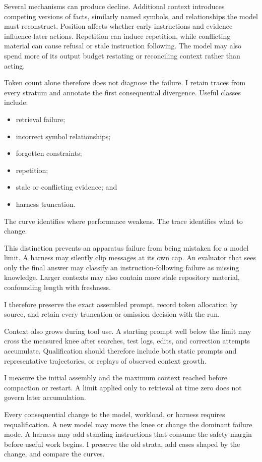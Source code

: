Several mechanisms can produce decline. Additional context introduces competing versions of facts, similarly named symbols, and relationships the model must reconstruct. Position affects whether early instructions and evidence influence later actions. Repetition can induce repetition, while conflicting material can cause refusal or stale instruction following. The model may also spend more of its output budget restating or reconciling context rather than acting.

Token count alone therefore does not diagnose the failure. I retain traces from every stratum and annotate the first consequential divergence. Useful classes include:

\begin{itemize}
\tightlist
\item
  retrieval failure;
\item
  incorrect symbol relationships;
\item
  forgotten constraints;
\item
  repetition;
\item
  stale or conflicting evidence; and
\item
  harness truncation.
\end{itemize}

The curve identifies where performance weakens. The trace identifies what to change.

This distinction prevents an apparatus failure from being mistaken for a model limit. A harness may silently clip messages at its own cap. An evaluator that sees only the final answer may classify an instruction-following failure as missing knowledge. Larger contexts may also contain more stale repository material, confounding length with freshness.

I therefore preserve the exact assembled prompt, record token allocation by source, and retain every truncation or omission decision with the run.

Context also grows during tool use. A starting prompt well below the limit may cross the measured knee after searches, test logs, edits, and correction attempts accumulate. Qualification should therefore include both static prompts and representative trajectories, or replays of observed context growth.

I measure the initial assembly and the maximum context reached before compaction or restart. A limit applied only to retrieval at time zero does not govern later accumulation.

Every consequential change to the model, workload, or harness requires requalification. A new model may move the knee or change the dominant failure mode. A harness may add standing instructions that consume the safety margin before useful work begins. I preserve the old strata, add cases shaped by the change, and compare the curves.

